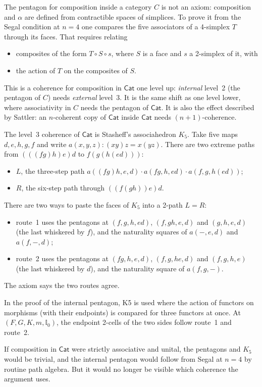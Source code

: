 \documentclass[11pt]{amsart}
\numberwithin{equation}{section}
\theoremstyle{definition}
\theoremstyle{remark}
\newcommand{\Cat}{\mathsf{Cat}}
\newcommand{\II}{\mathbb{I}}
\begin{document}
The pentagon for composition inside a category $C$ is not an axiom: composition
and $\alpha$ are defined from contractible spaces of simplices. To prove it
from the Segal condition at $n=4$ one compares the five associators of a
4-simplex $T$ through its faces. That requires relating
\begin{itemize}
\item composites of the form $T\circ S\circ s$, where $S$ is a face and $s$ a
  2-simplex of it, with
\item the action of $T$ on the composites of $S$.
\end{itemize}
This is a coherence for composition in $\Cat$ one level up: \emph{internal}
level~2 (the pentagon of $C$) needs \emph{external} level~3. It is the same
shift as one level lower, where associativity in $C$ needs the pentagon of
$\Cat$. It is also the effect described by Sattler: an $n$-coherent copy of
$\Cat$ inside $\Cat$ needs $(n+1)$-coherence.

The level~3 coherence of $\Cat$ is Stasheff's associahedron $K_5$. Take five
maps $d,e,h,g,f$ and write $a(x,y,z):(xy)z=x(yz)$. There are two extreme paths
from $(((fg)h)e)d$ to $f(g(h(ed)))$:
\begin{itemize}
\item $L$, the three-step path $a((fg)h,e,d)\cdot a(fg,h,ed)\cdot a(f,g,h(ed))$;
\item $R$, the six-step path through $((f(gh))e)d$.
\end{itemize}
There are two ways to paste the faces of $K_5$ into a 2-path $L=R$:
\begin{itemize}
\item route~1 uses the pentagons at $(f,g,h,ed)$, $(f,gh,e,d)$ and $(g,h,e,d)$
  (the last whiskered by $f$), and the naturality squares of $a(-,e,d)$ and
  $a(f,-,d)$;
\item route~2 uses the pentagons at $(fg,h,e,d)$, $(f,g,he,d)$ and
  $(f,g,h,e)$ (the last whiskered by $d$), and the naturality square of
  $a(f,g,-)$.
\end{itemize}
The axiom says the two routes agree.

In the proof of the internal pentagon, K5 is used where the action of functors
on morphisms (with their endpoints) is compared for three functors at once.
At $(F,G,K,m,\II_0)$, the endpoint 2-cells of the two sides follow route~1 and
route~2.

If composition in $\Cat$ were strictly associative and unital, the pentagons
and $K_5$ would be trivial, and the internal pentagon would follow from Segal
at $n=4$ by routine path algebra. But it would no longer be visible which
coherence the argument uses.
\end{document}
